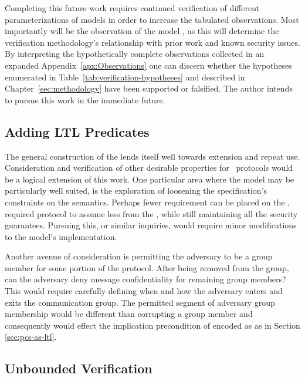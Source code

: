 Completing this future work requires continued verification of different parameterizations of  models in order to increase the tabulated observations.
Most importantly will be the observation of the model , as this will determine the verification methodology's relationship with prior work and known security issues.
By interpreting the hypothetically complete observations collected in an expanded Appendix\ \ref{apx:Observations} one can discern whether the hypotheses enumerated in Table\ \ref{tab:verification-hypotheses} and described in Chapter\ \ref{sec:methodology} have been supported or falsified.
The author intends to pursue this work in the immediate future.


\hypertarget{sec:more-predicates}{%
\subsection{Adding LTL Predicates}\label{sec:more-predicates}}

The general construction of the  lends itself well towards extension and repeat use.
Consideration and verification of other desirable properties for \CGKAdef\ protocols would be a logical extension of this work.
One particular area where the  model may be particularly well suited, is the exploration of loosening the  specification's constraints on the  semantics.
Perhaps fewer requirement can be placed on the , required protocol to assume less from the , while still maintaining all the  security guarantees.
Pursuing this, or similar inquiries, would require minor modifications to the  model's implementation.

Another avenue of consideration is permitting the adversary to be a group member for some portion of the \CGKAdef protocol.
After being removed from the group, can the adversary deny message confidentiality for remaining group members?
This would require carefully defining when and how the adversary enters and exits the communication group.
The permitted segment of adversary group membership would be different than corrupting a group member and consequently would effect the implication precondition of  encoded as  as in Section \ref{sec:pcs-as-ltl}.


\hypertarget{sec:unbounded-verification}{%
\subsection{Unbounded Verification}\label{sec:unbounded-verification}}

